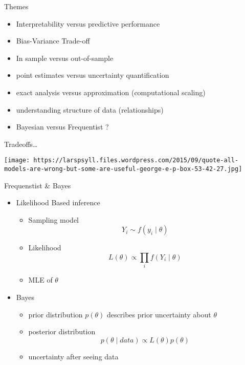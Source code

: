 \documentclass[ignorenonframetext,]{beamer}
\providecommand{\tightlist}{%
  \setlength{\itemsep}{0pt}\setlength{\parskip}{0pt}}
\begin{document}
\begin{frame}{Themes}
\protect\hypertarget{themes}{}

\begin{itemize}[<+->]
\tightlist
\item
  Interpretability versus predictive performance
\item
  Bias-Variance Trade-off
\item
  In sample versus out-of-sample
\item
  point estimates versus uncertainty quantification
\item
  exact analysis versus approximation (computational scaling)
\item
  understanding structure of data (relationships)
\item
  Bayesian versus Frequentist ?
\end{itemize}

\end{frame}

\begin{frame}{Tradeoffs\ldots{}}
\protect\hypertarget{tradeoffs}{}

\texttt{[image: https://larspsyll.files.wordpress.com/2015/09/quote-all-models-are-wrong-but-some-are-useful-george-e-p-box-53-42-27.jpg]}

\end{frame}

\begin{frame}{Frequenstist \& Bayes}
\protect\hypertarget{frequenstist-bayes}{}

\begin{itemize}[<+->]
\tightlist
\item
  Likelihood Based inference

  \begin{itemize}[<+->]
  \tightlist
  \item
    Sampling model \[Y_i \sim f(y_i \mid \theta)\]
  \item
    Likelihood \[L(\theta) \propto \prod_i f(Y_i \mid \theta)\]
  \item
    MLE of \(\theta\)
  \end{itemize}
\item
  Bayes

  \begin{itemize}[<+->]
  \tightlist
  \item
    prior distribution \(p(\theta)\) describes prior uncertainty about
    \(\theta\)
  \item
    posterior distribution
    \[p(\theta \mid data) \propto L(\theta)p(\theta)\]
  \item
    uncertainty after seeing data
  \end{itemize}
\end{itemize}

\end{frame}
\end{document}
